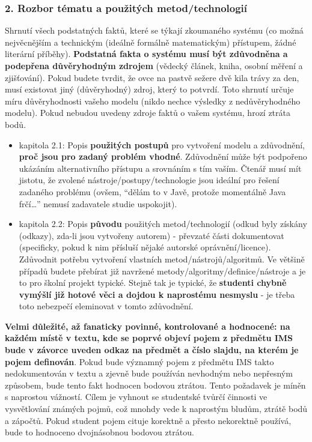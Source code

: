 \documentclass{article}
\begin{document}
\subsubsection{2. Rozbor tématu a použitých
metod/technologií}\label{rozbor-tuxe9matu-a-pouux17eituxfdch-metodtechnologiuxed}

Shrnutí všech podstatných faktů, které se týkají zkoumaného systému (co
možná nejvěcnějším a technickým (ideálně formálně matematickým)
přístupem, žádné literární příběhy). \textbf{Podstatná fakta o systému
musí být zdůvodněna a podepřena důvěryhodným zdrojem} (vědecký článek,
kniha, osobní měření a zjišťování). Pokud budete tvrdit, že ovce na
pastvě sežere dvě kila trávy za den, musí existovat jiný (důvěryhodný)
zdroj, který to potvrdí. Toto shrnutí určuje míru důvěryhodnosti vašeho
modelu (nikdo nechce výsledky z nedůvěryhodného modelu). Pokud nebudou
uvedeny zdroje faktů o vašem systému, hrozí ztráta bodů.\\

\begin{itemize}
\tightlist
\item
  kapitola 2.1: Popis \textbf{použitých postupů} pro vytvoření modelu a
  zdůvodnění, \textbf{proč jsou pro zadaný problém vhodné}. Zdůvodnění
  může být podpořeno ukázáním alternativního přístupu a srovnáním s tím
  vaším. Čtenář musí mít jistotu, že zvolené
  nástroje/postupy/technologie jsou ideální pro řešení zadaného problému
  (ovšem, ``dělám to v Javě, protože momentálně Java frčí\ldots{}''
  nemusí zadavatele studie uspokojit).
\item
  kapitola 2.2: Popis \textbf{původu} použitých metod/technologií (odkud
  byly získány (odkazy), zda-li jsou vytvořeny autorem) - převzaté části
  dokumentovat (specificky, pokud k nim přísluší nějaké autorské
  oprávnění/licence). Zdůvodnit potřebu vytvoření vlastních
  metod/nástrojů/algoritmů. Ve většině případů budete přebírat již
  navržené metody/algoritmy/definice/nástroje a je to pro školní projekt
  typické. Stejně tak je typické, že \textbf{studenti chybně vymýšlí již
  hotové věci a dojdou k naprostému nesmyslu} - je třeba toto nebezpečí
  eleminovat v tomto zdůvodnění.
\end{itemize}

\textbf{Velmi důležité, až fanaticky povinné, kontrolované a hodnocené:
na každém místě v textu, kde se poprvé objeví pojem z předmětu IMS bude
v závorce uveden odkaz na předmět a číslo slajdu, na kterém je pojem
definován}. Pokud bude významný pojem z předmětu IMS takto
nedokumentován v textu a zjevně bude používán nevhodným nebo nepřesným
způsobem, bude tento fakt hodnocen bodovou ztrátou. Tento požadavek je
míněn s naprostou vážností. Cílem je vyhnout se studentské tvůrčí
činnosti ve vysvětlování známých pojmů, což mnohdy vede k naprostým
bludům, ztrátě bodů a zápočtů. Pokud student pojem cituje korektně a
přesto nekorektně používá, bude to hodnoceno dvojnásobnou bodovou
ztrátou.\\[2\baselineskip]
\end{document}
